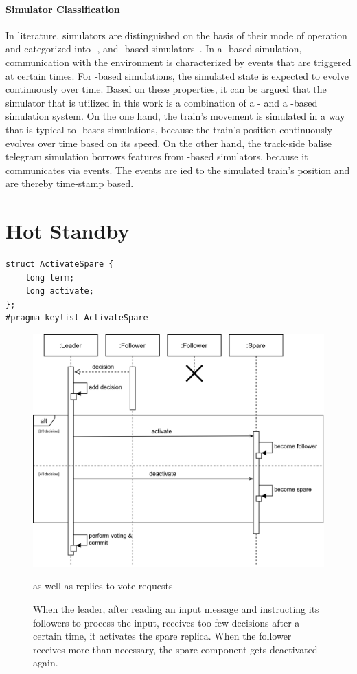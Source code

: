 \paragraph{Simulator Classification}
In literature, simulators are distinguished on the basis of their mode of operation and categorized into -, and -based simulators~\cite{CoSimulationStateOfTheArt}.
In a -based simulation, communication with the environment is characterized by events that are triggered at certain times.
For -based simulations, the simulated state is expected to evolve continuously over time.
Based on these properties, it can be argued that the simulator that is utilized in this work is a combination of a - and a -based simulation system.
On the one hand, the train's movement is simulated in a way that is typical to -bases simulations, because the train's position continuously evolves over time based on its speed.
On the other hand, the track-side balise telegram simulation borrows features from -based simulators, because it communicates via events.
The events are ied to the simulated train's position and are thereby time-stamp based.

\section{Hot Standby}
\begin{lstlisting}[caption={\abr{IDL} definition for the \texttt{ActivateSpare} topic. This topic is used to activate or deactivate spare replicas. The \texttt{term} field encodes the term in which the activate or deactivate call has been made and \texttt{activate} gets interpreted as a boolean that encodes whether the spare should be activated or deactivated.}, label=code:activateSpare]
struct ActivateSpare {
    long term;
    long activate;
};
#pragma keylist ActivateSpare
\end{lstlisting}

\begin{figure}[!hb]
	\centering
	\includegraphics[width=0.75\linewidth]{images/sequence/ActivateSpare}
	\caption{When the leader, after reading an input message and instructing its followers to process the input, receives too few decisions after a certain time, it activates the spare replica. When the follower receives more than necessary, the spare component gets deactivated again.} as well as replies to vote requests
	\label{fig:SeqActivateSpare}
\end{figure}


